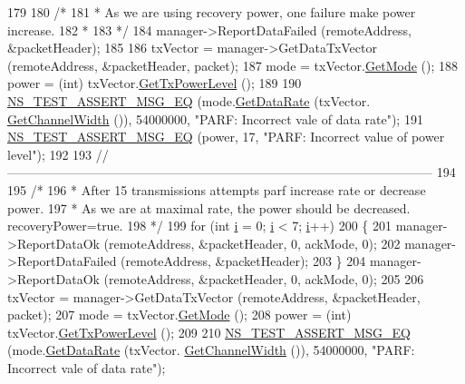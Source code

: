 \begin{DoxyCode}
179 
180   \textcolor{comment}{/*}
181 \textcolor{comment}{   * As we are using recovery power, one failure make power increase.}
182 \textcolor{comment}{   *}
183 \textcolor{comment}{   */}
184   manager->ReportDataFailed (remoteAddress, &packetHeader);
185 
186   txVector = manager->GetDataTxVector (remoteAddress, &packetHeader, packet);
187   mode = txVector.\hyperlink{classns3_1_1WifiTxVector_a497b1f11cad4b8b26251dfa07c9ad1d6}{GetMode} ();
188   power = (int) txVector.\hyperlink{classns3_1_1WifiTxVector_a7c98bd9609ff1c5cefa6e22d6908a2fe}{GetTxPowerLevel} ();
189 
190   \hyperlink{group__testing_ga2a9d78cffb3db8e867c35fff0b698cf5}{NS\_TEST\_ASSERT\_MSG\_EQ} (mode.\hyperlink{classns3_1_1WifiMode_adcfbe150f69da720db23387f733b8a52}{GetDataRate} (txVector.
      \hyperlink{classns3_1_1WifiTxVector_a1f8bfa51778a3e217581eb665f059564}{GetChannelWidth} ()), 54000000, \textcolor{stringliteral}{"PARF: Incorrect vale of data rate"});
191   \hyperlink{group__testing_ga2a9d78cffb3db8e867c35fff0b698cf5}{NS\_TEST\_ASSERT\_MSG\_EQ} (power, 17, \textcolor{stringliteral}{"PARF: Incorrect value of power level"});
192 
193   \textcolor{comment}{//-----------------------------------------------------------------------------------------------------}
194 
195   \textcolor{comment}{/*}
196 \textcolor{comment}{   * After 15 transmissions attempts parf increase rate or decrease power.}
197 \textcolor{comment}{   * As we are at maximal rate, the power should be decreased. recoveryPower=true.}
198 \textcolor{comment}{   */}
199   \textcolor{keywordflow}{for} (\textcolor{keywordtype}{int} \hyperlink{bernuolliDistribution_8m_a6f6ccfcf58b31cb6412107d9d5281426}{i} = 0; \hyperlink{bernuolliDistribution_8m_a6f6ccfcf58b31cb6412107d9d5281426}{i} < 7; \hyperlink{bernuolliDistribution_8m_a6f6ccfcf58b31cb6412107d9d5281426}{i}++)
200     \{
201       manager->ReportDataOk (remoteAddress, &packetHeader, 0, ackMode, 0);
202       manager->ReportDataFailed (remoteAddress, &packetHeader);
203     \}
204   manager->ReportDataOk (remoteAddress, &packetHeader, 0, ackMode, 0);
205 
206   txVector = manager->GetDataTxVector (remoteAddress, &packetHeader, packet);
207   mode = txVector.\hyperlink{classns3_1_1WifiTxVector_a497b1f11cad4b8b26251dfa07c9ad1d6}{GetMode} ();
208   power = (int) txVector.\hyperlink{classns3_1_1WifiTxVector_a7c98bd9609ff1c5cefa6e22d6908a2fe}{GetTxPowerLevel} ();
209 
210   \hyperlink{group__testing_ga2a9d78cffb3db8e867c35fff0b698cf5}{NS\_TEST\_ASSERT\_MSG\_EQ} (mode.\hyperlink{classns3_1_1WifiMode_adcfbe150f69da720db23387f733b8a52}{GetDataRate} (txVector.
      \hyperlink{classns3_1_1WifiTxVector_a1f8bfa51778a3e217581eb665f059564}{GetChannelWidth} ()), 54000000, \textcolor{stringliteral}{"PARF: Incorrect vale of data rate"});

\end{DoxyCode}
